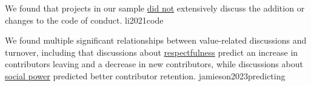\documentclass{article}
\begin{document}




  {We found that projects in our sample \ul{did not} extensively discuss the addition or changes to the code of conduct.}
  {li2021code}

  {We found multiple significant relationships between value-related discussions and turnover, including that discussions about \ul{respectfulness} predict an increase in contributors leaving and a decrease in new contributors, while discussions about \ul{social power} predicted better contributor retention.}
  {jamieson2023predicting}

\end{document}
